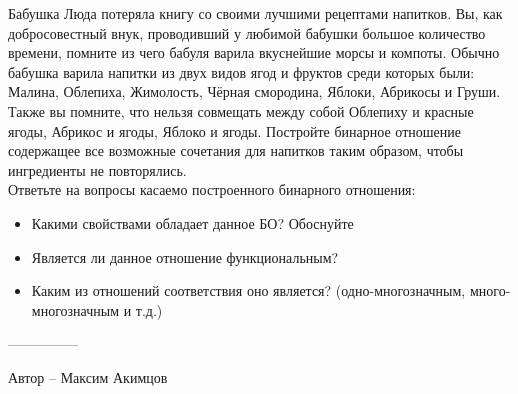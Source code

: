 \question
Бабушка Люда потеряла книгу со своими лучшими рецептами напитков. Вы, как добросовестный внук, проводивший у любимой бабушки большое количество времени, помните из чего бабуля варила вкуснейшие морсы и компоты. Обычно бабушка варила напитки из двух видов ягод и фруктов среди которых были: Малина, Облепиха, Жимолость, Чёрная смородина, Яблоки, Абрикосы и Груши. Также вы помните, что нельзя совмещать между собой Облепиху и красные ягоды, Абрикос и ягоды, Яблоко и ягоды. Постройте бинарное отношение содержащее все возможные сочетания для напитков таким образом, чтобы ингредиенты не повторялись.
\\
Ответьте на вопросы касаемо построенного бинарного отношения:
\begin{itemize}
    \item Какими свойствами обладает данное БО? Обоснуйте
    \item Является ли данное отношение функциональным?
    \item Каким из отношений соответствия оно является? (одно-многозначным, много-многозначным и т.д.)
\end{itemize}

---------------

Автор -- Максим Акимцов